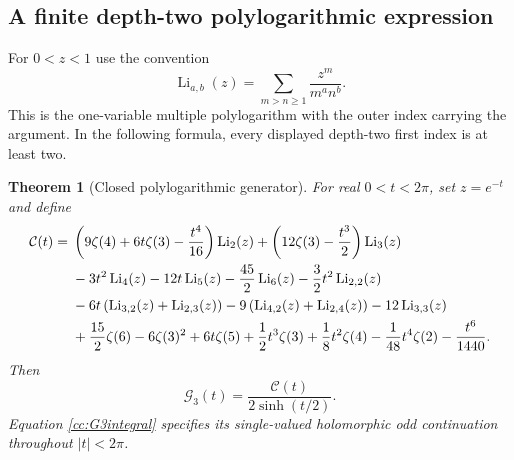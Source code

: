 \documentclass[11pt,letterpaper]{article}
\newtheorem{theorem}{Theorem}[section]
\theoremstyle{definition}
\theoremstyle{remark}
\numberwithin{equation}{section}
\begin{document}
\subsection{A finite depth-two polylogarithmic expression}

For $0<z<1$ use the convention
\[
 \operatorname{Li}_{a,b}(z)
   =\sum_{m>n\ge1}\frac{z^m}{m^a n^b}.
\]
This is the one-variable multiple polylogarithm with the outer index
carrying the argument.  In the following formula, every displayed
depth-two first index is at least two.

\begin{theorem}[Closed polylogarithmic generator]
\label{cc:polylog}
For real $0<t<2\pi$, set $z=e^{-t}$ and define
\begin{align}
 \mathcal C(t)={}&
 \left(9\zeta(4)+6t\zeta(3)-\frac{t^4}{16}\right)
           \operatorname{Li}_2(z)
 +\left(12\zeta(3)-\frac{t^3}{2}\right)\operatorname{Li}_3(z)
       \notag\\
 &-3t^2\operatorname{Li}_4(z)-12t\operatorname{Li}_5(z)
       -\frac{45}{2}\operatorname{Li}_6(z)
       -\frac32t^2\operatorname{Li}_{2,2}(z)
       \notag\\
 &-6t\left(\operatorname{Li}_{3,2}(z)+\operatorname{Li}_{2,3}(z)\right)
       -9\left(\operatorname{Li}_{4,2}(z)+\operatorname{Li}_{2,4}(z)\right)
       -12\operatorname{Li}_{3,3}(z)
       \notag\\
 &+\frac{15}{2}\zeta(6)-6\zeta(3)^2+6t\zeta(5)
       +\frac12t^3\zeta(3)+\frac18t^2\zeta(4)
       -\frac1{48}t^4\zeta(2)-\frac{t^6}{1440}.
       \label{cc:Cpolylog}
\end{align}
Then
\begin{equation}\label{cc:G3polylog}
 \mathcal G_3(t)=\frac{\mathcal C(t)}{2\sinh(t/2)}.
\end{equation}
Equation \eqref{cc:G3integral} specifies its single-valued holomorphic
odd continuation throughout $|t|<2\pi$.
\end{theorem}
\end{document}
